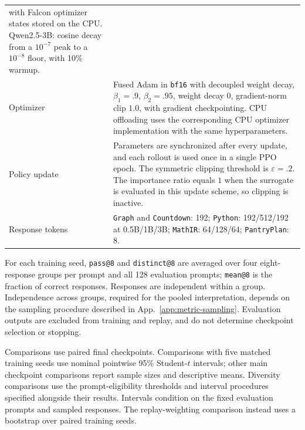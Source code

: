 \begin{table}[!htbp]
\begin{tabularx}{\linewidth}{@{}P{.23\linewidth}Y@{}}
      with Falcon optimizer states stored on the CPU. Qwen2.5-3B: cosine
      decay from a $10^{-7}$ peak to a $10^{-8}$ floor, with 10\% warmup. \\
    Optimizer & Fused Adam in \texttt{bf16} with decoupled weight decay,
      $\beta_1=.9$, $\beta_2=.95$, weight decay $0$, gradient-norm clip $1.0$,
      with gradient checkpointing. CPU offloading uses the corresponding
      CPU optimizer implementation with the same hyperparameters. \\
    Policy update & Parameters are synchronized after every update, and each
      rollout is used once in a single PPO epoch. The symmetric clipping
      threshold is $\varepsilon=.2$. The importance ratio equals $1$ when
      the surrogate is evaluated in this update scheme, so clipping is inactive. \\
    Response tokens & \texttt{Graph} and \texttt{Countdown}: 192; \texttt{Python}: 192/512/192
      at 0.5B/1B/3B; \texttt{MathIR}: 64/128/64; \texttt{PantryPlan}: 8. \\
    \bottomrule
  \end{tabularx}
\end{table}



For each training seed, \texttt{pass@8} and \texttt{distinct@8} are averaged
over four eight-response groups per prompt and all 128 evaluation prompts;
\texttt{mean@8} is the fraction of correct responses. Responses are independent
within a group. Independence across groups, required for the pooled \pmd{}
interpretation, depends on the sampling procedure described in
App.~\ref{app:metric-sampling}. Evaluation outputs are excluded from training
and replay, and do not determine checkpoint selection or stopping.

Comparisons use paired final checkpoints. Comparisons with five matched
training seeds use nominal pointwise 95\% Student-$t$ intervals; other main
checkpoint comparisons report sample sizes and descriptive means. Diversity
comparisons use the prompt-eligibility thresholds and interval procedures
specified alongside their results. Intervals condition on the fixed evaluation
prompts and sampled responses. The replay-weighting comparison instead uses
a bootstrap over paired training seeds.


